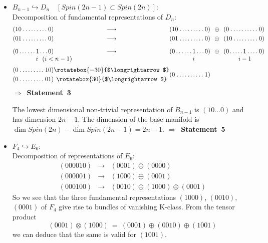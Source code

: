 \documentclass[12pt,a4paper]{article}
\newcommand{\embin}{{\hookrightarrow}}
\begin{document}
\begin{appendix}
\begin{itemize}
\item $B_{n-1}\embin D_{n}\quad [Spin (2n-1)\subset Spin (2n)]$:\\
Decomposition of fundamental representations of $D_{n}$:
\[
\setlength{\arraycolsep}{0mm}
\begin{array}{p{13mm}p{10mm}cp{13mm}p{10mm}cp{11mm}p{12mm}}
\multicolumn{2}{l}{(10\dotfill0)}&\ \ \ \longrightarrow\ \ \ 
&\multicolumn{2}{l}{(10\dotfill0)}&\ \ \oplus \ \ 
&\multicolumn{2}{l}{(0\dotfill0)}\\[1mm]
\multicolumn{2}{l}{(01\dotfill0)}&\ \ \ \longrightarrow\ \ \ 
&\multicolumn{2}{l}{(01\dotfill0)}&\ \ \oplus \ \ 
&\multicolumn{2}{l}{(10\dotfill0)}\\[3mm]
$(0\dotfill$&$1\dotfill0)$&\longrightarrow
&$(0\dotfill$&$1\dotfill0)$& \oplus 
&$(0\dotfill$&$1\dotfill0)$\\
&\makebox[0cm][l]{$i\ \ (i<n-1)$}& & &$i$& & &\makebox[2mm]{$i-1$}\\[2mm]
\multicolumn{2}{l}{\begin{array}{p{23mm}}
$(0\dotfill10)$\\[1mm] 
$(0\dotfill01)$
\end{array}}&
\begin{array}{c}
\rotatebox{-30}{$\longrightarrow$} \\[1mm] \rotatebox{30}{$\longrightarrow$}
\end{array}&
\multicolumn{2}{l}{(0\dotfill 1)}
\end{array}
\]
$\Rightarrow $~{\bf Statement~3}

The lowest dimensional non-trivial representation of $B_{n-1}$ is
$(10\dots 0)$ and has dimension $2n-1$. The dimension of the base
manifold is $\dim Spin (2n)-\dim Spin
(2n-1)=2n-1$. $\Rightarrow $~{\bf Statement~5}

\item $F_{4}\embin E_{6}$:\\
Decomposition of representations of $E_{6}$:
\begin{eqnarray*}
(000010)&\longrightarrow & (0001)\oplus (0000)\\
(000001)&\longrightarrow & (1000)\oplus (0001)\\
(000100)& \longrightarrow & (0010)\oplus (1000)\oplus (0001) 
\end{eqnarray*}
So we see that the three fundamental representations $(1000)$,
$(0010)$, $(0001)$ of $F_{4}$ give rise to bundles of vanishing
K-class. From the tensor product
\[
(0001)\otimes (1000)\ =\ (0001)\oplus (0010)\oplus (1001)
\]
we can deduce that the same is valid for $(1001)$.


\end{itemize}
\end{appendix}
\end{document}
